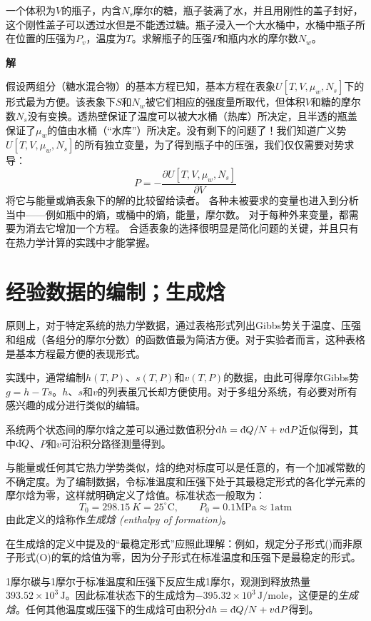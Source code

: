 \begin{example}
一个体积为$V$的瓶子，内含$N_s$摩尔的糖，瓶子装满了水，并且用刚性的盖子封好，这个刚性盖子可以透过水但是不能透过糖。瓶子浸入一个大水桶中，水桶中瓶子所在位置的压强为$P_v$，温度为$T$。求解瓶子的压强$P$和瓶内水的摩尔数$N_w$。

{\bf 解}

假设两组分（糖水混合物）的基本方程已知，基本方程在表象$U[T, V, \mu_w, N_s]$下的形式最为方便。该表象下$S$和$N_{w}$被它们相应的强度量所取代，但体积$V$和糖的摩尔数$N_{s}$没有变换。透热壁保证了温度可以被大水桶（热库）所决定，且半透的瓶盖保证了$\mu_{w}$的值由水桶（“水库”）所决定。没有剩下的问题了！我们知道广义势$U[T, V, \mu_{w}, N_{s}]$的所有独立变量，为了得到瓶子中的压强，我们仅仅需要对势求导：
\[ P=-\frac{\partial U[T, V, \mu_{w}, N_{s}]}{\partial V} \]
将它与能量或熵表象下的解的比较留给读者。
各种未被要求的变量也进入到分析当中——例如瓶中的熵，或桶中的熵，能量，摩尔数。
对于每种外来变量，都需要为消去它增加一个方程。
合适表象的选择很明显是简化问题的关键，并且只有在热力学计算的实践中才能掌握。
\end{example}

\section{经验数据的编制；生成焓}
\label{sec6.6}
原则上，对于特定系统的热力学数据，通过表格形式列出Gibbs势关于温度、压强和组成（各组分的摩尔分数）的函数值最为简洁方便。对于实验者而言，这种表格是基本方程最方便的表现形式。

实践中，通常编制$h(T,P)$、$s(T,P)$和$v(T,P)$的数据，由此可得摩尔Gibbs势$g = h - Ts$。$h$、$s$和$v$的列表虽冗长却方便使用。对于多组分系统，有必要对所有感兴趣的成分进行类似的编辑。

系统两个状态间的摩尔焓之差可以通过数值积分$\mathrm{d} h=\mathrm d\hspace*{-0.1em}\bar{}\hspace*{0.08em} Q/N + v \mathrm{d}  P$近似得到，其中$\mathrm d\hspace*{-0.1em}\bar{}\hspace*{0.08em} Q$、$P$和$v$可沿积分路径测量得到。


与能量或任何其它热力学势类似，焓的绝对标度可以是任意的，有一个加减常数的不确定度。为了编制数据，令标准温度和压强下处于其最稳定形式的各化学元素的摩尔焓为零，这样就明确定义了焓值。标准状态一般取为：
\[ T_0 = \SI{298.15}{K} = 25^{\circ}\mathrm{C}, \qquad P_0 = 0.1 \text{MPa} \approx 1 \text{atm} \]
由此定义的焓称作{\it 生成焓 (enthalpy of formation)}。

在生成焓的定义中提及的“最稳定形式”应照此理解：例如，规定分子形式()而非原子形式(O)的氧的焓值为零，因为分子形式在标准温度和压强下是最稳定的形式。

1摩尔碳与1摩尔于标准温度和压强下反应生成1摩尔，观测到释放热量$393.52\times10^3\,\text{J}$。因此标准状态下的生成焓为$-395.32\times10^3 \, \text{J}/\text{mole}$，这便是的{\it 生成焓}。任何其他温度或压强下的生成焓可由积分$\mathrm{d} h=\mathrm d\hspace*{-0.1em}\bar{}\hspace*{0.08em} Q/N + v\mathrm{d} P$得到。

